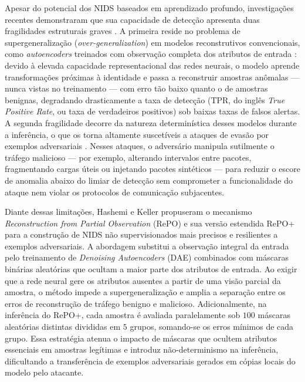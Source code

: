 \documentclass[conference]{IEEEtran}
\begin{document}
Apesar do potencial dos NIDS baseados em aprendizado profundo, investigações recentes demonstraram que sua capacidade de detecção apresenta duas fragilidades estruturais graves \cite{hashemi2019, aiken2019, hashemi2020}.
A primeira reside no problema de supergeneralização (\textit{over-generalization}) em modelos reconstrutivos convencionais, como \textit{autoencoders} treinados com observação completa dos atributos de entrada \cite{mirsky2018}: devido à elevada capacidade representacional das redes neurais, o modelo aprende transformações próximas à identidade e passa a reconstruir amostras anômalas — nunca vistas no treinamento — com erro tão baixo quanto o de amostras benignas, degradando drasticamente a taxa de detecção ($\text{TPR}$, do inglês \textit{True Positive Rate}, ou taxa de verdadeiros positivos) sob baixas taxas de falsos alertas.
A segunda fragilidade decorre da natureza determinística desses modelos durante a inferência, o que os torna altamente suscetíveis a ataques de evasão por exemplos adversariais \cite{biggio2013, szegedy2013, hashemi2019}.
Nesses ataques, o adversário manipula sutilmente o tráfego malicioso — por exemplo, alterando intervalos entre pacotes, fragmentando cargas úteis ou injetando pacotes sintéticos — para reduzir o escore de anomalia abaixo do limiar de detecção sem comprometer a funcionalidade do ataque nem violar os protocolos de comunicação subjacentes.

Diante dessas limitações, Hashemi e Keller \cite{hashemi2020} propuseram o mecanismo \textit{Reconstruction from Partial Observation} (RePO) e sua versão estendida RePO+ para a construção de NIDS não supervisionados mais precisos e resilientes a exemplos adversariais.
A abordagem substitui a observação integral da entrada pelo treinamento de \textit{Denoising Autoencoders} (DAE) \cite{vincent2008} combinados com máscaras binárias aleatórias que ocultam a maior parte dos atributos de entrada.
Ao exigir que a rede neural gere os atributos ausentes a partir de uma visão parcial da amostra, o método impede a supergeneralização e amplia a separação entre os erros de reconstrução de tráfego benigno e malicioso.
Adicionalmente, na inferência do RePO+, cada amostra é avaliada paralelamente sob $100$ máscaras aleatórias distintas divididas em $5$ grupos, somando-se os erros mínimos de cada grupo.
Essa estratégia atenua o impacto de máscaras que ocultem atributos essenciais em amostras legítimas e introduz não-determinismo na inferência, dificultando a transferência de exemplos adversariais gerados em cópias locais do modelo pelo atacante.
\end{document}
